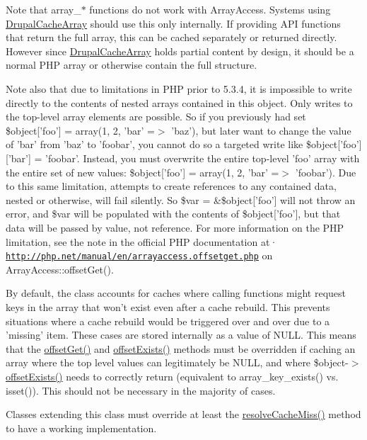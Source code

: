 Note that array\_\-$\ast$ functions do not work with ArrayAccess. Systems using \hyperlink{classDrupalCacheArray}{DrupalCacheArray} should use this only internally. If providing API functions that return the full array, this can be cached separately or returned directly. However since \hyperlink{classDrupalCacheArray}{DrupalCacheArray} holds partial content by design, it should be a normal PHP array or otherwise contain the full structure.

Note also that due to limitations in PHP prior to 5.3.4, it is impossible to write directly to the contents of nested arrays contained in this object. Only writes to the top-\/level array elements are possible. So if you previously had set \$object\mbox{[}'foo'\mbox{]} = array(1, 2, 'bar' =$>$ 'baz'), but later want to change the value of 'bar' from 'baz' to 'foobar', you cannot do so a targeted write like \$object\mbox{[}'foo'\mbox{]}\mbox{[}'bar'\mbox{]} = 'foobar'. Instead, you must overwrite the entire top-\/level 'foo' array with the entire set of new values: \$object\mbox{[}'foo'\mbox{]} = array(1, 2, 'bar' =$>$ 'foobar'). Due to this same limitation, attempts to create references to any contained data, nested or otherwise, will fail silently. So \$var = \&\$object\mbox{[}'foo'\mbox{]} will not throw an error, and \$var will be populated with the contents of \$object\mbox{[}'foo'\mbox{]}, but that data will be passed by value, not reference. For more information on the PHP limitation, see the note in the official PHP documentation at· \href{http://php.net/manual/en/arrayaccess.offsetget.php}{\tt http://php.net/manual/en/arrayaccess.offsetget.php} on ArrayAccess::offsetGet().

By default, the class accounts for caches where calling functions might request keys in the array that won't exist even after a cache rebuild. This prevents situations where a cache rebuild would be triggered over and over due to a 'missing' item. These cases are stored internally as a value of NULL. This means that the \hyperlink{group__schemaapi_ga57be4d1b39bee68ee1c395c1cd9a2de5}{offsetGet()} and \hyperlink{group__schemaapi_gabec90ca8c02f7c14dfbf66fd9e6bb5dd}{offsetExists()} methods must be overridden if caching an array where the top level values can legitimately be NULL, and where \$object-\/$>$\hyperlink{group__schemaapi_gabec90ca8c02f7c14dfbf66fd9e6bb5dd}{offsetExists()} needs to correctly return (equivalent to array\_\-key\_\-exists() vs. isset()). This should not be necessary in the majority of cases.

Classes extending this class must override at least the \hyperlink{group__schemaapi_ga33d892a839b353177e2483f6946178e9}{resolveCacheMiss()} method to have a working implementation.

